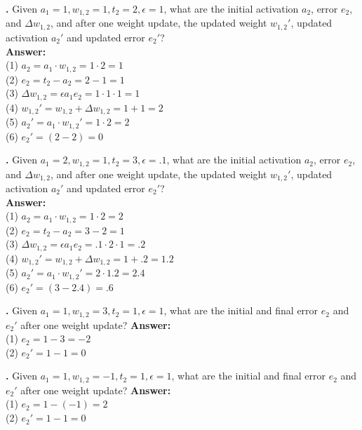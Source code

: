 


\noindent
{}
{\bf \theLMSCounter.}  Given $a_1 = 1, w_{1,2} = 1, t_2 = 2,\epsilon = 1$, what are the initial activation $a_2$, error $e_2$, and $\Delta w_{1,2}$, and after one weight update, the updated weight $w_{1,2}'$, updated activation  $a_2'$ and updated error $e_2'$? \\
{\bf Answer:}  \\
(1) $a_2 = a_1 \cdot w_{1,2} = 1 \cdot 2 = 1$ \\
(2) $e_2 = t_2 - a_2 = 2 - 1 = 1 $ \\
(3) $\Delta w_{1,2} = \epsilon a_1 e_2 = 1 \cdot 1 \cdot 1 = 1$ \\
(4) $w_{1,2}' = w_{1,2} + \Delta w_{1,2}  = 1 + 1 = 2$\\
(5) $a_2' =  a_1 \cdot w_{1,2}' = 1 \cdot 2 = 2$\\
(6) $e_2' = (2-2) = 0$
\bigskip

\noindent
{}
{\bf \theLMSCounter.}  Given $a_1 = 2, w_{1,2} = 1, t_2 = 3 ,\epsilon = .1$, what are the initial activation $a_2$, error $e_2$, and $\Delta w_{1,2}$, and after one weight update, the updated weight $w_{1,2}'$, updated activation  $a_2'$ and updated error $e_2'$? \\
{\bf Answer:}  \\
(1) $a_2 = a_1 \cdot w_{1,2} = 1 \cdot 2 = 2$ \\
(2) $e_2 = t_2 - a_2 = 3 - 2 = 1 $ \\
(3) $\Delta w_{1,2} = \epsilon a_1 e_2 = .1 \cdot 2 \cdot 1 = .2$ \\
(4) $w_{1,2}' = w_{1,2} + \Delta w_{1,2}  = 1 + .2 = 1.2$\\
(5) $a_2' =  a_1 \cdot w_{1,2}' = 2 \cdot 1.2 = 2.4$\\
(6) $e_2' = (3 - 2.4) = .6$
\bigskip

\noindent
{}
{\bf \theLMSCounter.}  Given $a_1 = 1, w_{1,2} = 3, t_2 = 1 ,\epsilon = 1$, what are the initial and final error $e_2$ and $e_2'$ after one weight update? 
{\bf Answer:}  \\
(1) $e_2 =  1 - 3  = -2 $ \\
(2) $e_2' = 1 - 1 = 0$
\bigskip

\noindent
{}
{\bf \theLMSCounter.}  Given $a_1 = 1, w_{1,2} = -1, t_2 = 1 ,\epsilon = 1$, what are the initial and final error $e_2$ and $e_2'$ after one weight update? 
{\bf Answer:}  \\
(1) $e_2 =  1 - (-1)  = 2 $ \\
(2) $e_2' = 1 - 1 = 0$
\bigskip



